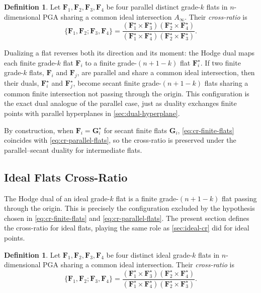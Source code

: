 \documentclass{birkjour}
\theoremstyle{definition}
\newtheorem{definition}[theorem]{Definition}
\theoremstyle{remark}
\begin{document}
\begin{definition}
\label{def:cr-parallel-flats}
Let $\mathbf{F}_1, \mathbf{F}_2, \mathbf{F}_3, \mathbf{F}_4$ be four parallel distinct grade-$k$ flats in $n$-dimensional PGA sharing a common ideal intersection $A_\infty$. Their \emph{cross-ratio} is
\begin{equation}
  \{\mathbf{F}_1, \mathbf{F}_2; \mathbf{F}_3, \mathbf{F}_4\}
  =
  \frac{(\mathbf{F}_1^\star \times \mathbf{F}_3^\star)
        (\mathbf{F}_2^\star \times \mathbf{F}_4^\star)}
       {(\mathbf{F}_1^\star \times \mathbf{F}_4^\star)
        (\mathbf{F}_2^\star \times \mathbf{F}_3^\star)}.
  \label{eq:cr-parallel-flats}
\end{equation}
\end{definition}

Dualizing a flat reverses both its direction and its moment: the Hodge dual maps each finite grade-$k$ flat $\mathbf{F}_i$ to a finite grade-$(n+1-k)$ flat $\mathbf{F}_i^\star$. If two finite grade-$k$ flats, $\mathbf{F}_i$ and $\mathbf{F}_j$, are parallel and share a common ideal intersection, then their duals, $\mathbf{F}_i^\star$ and $\mathbf{F}_j^\star$, become secant finite grade-$(n+1-k)$ flats sharing a common finite intersection not passing through the origin. This configuration is the exact dual analogue of the parallel case, just as duality exchanges finite points with parallel hyperplanes in \cref{sec:dual-hyperplane}.

By construction, when $\mathbf{F}_i = \mathbf{G}_i^\star$ for secant finite flats $\mathbf{G}_i$, \eqref{eq:cr-finite-flats} coincides with \eqref{eq:cr-parallel-flats}, so the cross-ratio is preserved under the parallel--secant duality for intermediate flats.

\subsection{Ideal Flats Cross-Ratio}
\label{sec:ideal_flat_cross_ratio}

The Hodge dual of an ideal grade-$k$ flat is a finite grade-$(n+1-k)$ flat passing through the origin. This is precisely the configuration excluded by the hypothesis chosen in \eqref{eq:cr-finite-flats} and \eqref{eq:cr-parallel-flats}. The present section defines the cross-ratio for ideal flats, playing the same role as \cref{sec:ideal-cr} did for ideal points.

\begin{definition}
\label{def:cr-ideal-flats}
Let $\mathbf{F}_1, \mathbf{F}_2, \mathbf{F}_3, \mathbf{F}_4$ be four distinct ideal grade-$k$ flats in $n$-dimensional PGA sharing a common ideal intersection. Their \emph{cross-ratio} is
\begin{equation}
  \{\mathbf{F}_1, \mathbf{F}_2; \mathbf{F}_3, \mathbf{F}_4\}
  =
  \frac{(\mathbf{F}_1^\star \times \mathbf{F}_3^\star)
        (\mathbf{F}_2^\star \times \mathbf{F}_4^\star)}
       {(\mathbf{F}_1^\star \times \mathbf{F}_4^\star)
        (\mathbf{F}_2^\star \times \mathbf{F}_3^\star)}.
  \label{eq:cr-ideal-flats}
\end{equation}
\end{definition}
\end{document}
